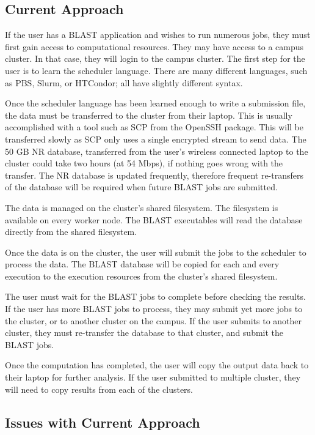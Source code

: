 \subsection{Current Approach}


If the user has a BLAST application and wishes to run numerous jobs, they must first gain access to computational resources.  They may have access to a campus cluster.  In that case, they will login to the campus cluster.  The first step for the user is to learn the scheduler language.  There are many different languages, such as PBS, Slurm, or HTCondor; all  have slightly different syntax.

Once the scheduler language has been learned enough to write a submission file, the data must be transferred to the cluster from their laptop.  This is usually accomplished with a tool such as SCP from the OpenSSH \cite{openssh} package.  This will be transferred slowly as SCP only uses a single encrypted stream to send data.  The 50 GB NR database, transferred from the user's wireless connected laptop to the cluster could take two hours (at 54 Mbps), if nothing goes wrong with the transfer.  The NR database is updated frequently, therefore frequent re-transfers of the database will be required when future BLAST jobs are submitted.

The data is managed on the cluster's shared filesystem.  The filesystem is available on every worker node.  The BLAST executables will read the database directly from the shared filesystem.

Once the data is on the cluster, the user will submit the jobs to the scheduler to process the data.  The BLAST database will be copied for each and every execution to the execution resources from the cluster's shared filesystem.

The user must wait for the BLAST jobs to complete before checking the results.  If the user has more BLAST jobs to process, they may submit yet more jobs to the cluster, or to another cluster on the campus.  If the user submits to another cluster, they must re-transfer the database to that cluster, and submit the BLAST jobs.

Once the computation has completed, the user will copy the output data back to their laptop for further analysis.  If the user submitted to multiple cluster, they will need to copy results from each of the clusters.

\subsection{Issues with Current Approach}

